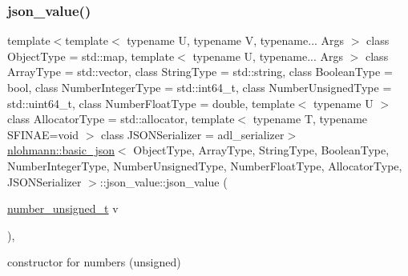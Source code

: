 \subsubsection{\texorpdfstring{json\+\_\+value()}{json\_value()}\hspace{0.1cm}{\footnotesize\ttfamily [4/12]}}
{\footnotesize\ttfamily template$<$template$<$ typename U, typename V, typename... Args $>$ class Object\+Type = std\+::map, template$<$ typename U, typename... Args $>$ class Array\+Type = std\+::vector, class String\+Type  = std\+::string, class Boolean\+Type  = bool, class Number\+Integer\+Type  = std\+::int64\+\_\+t, class Number\+Unsigned\+Type  = std\+::uint64\+\_\+t, class Number\+Float\+Type  = double, template$<$ typename U $>$ class Allocator\+Type = std\+::allocator, template$<$ typename T, typename S\+F\+I\+N\+A\+E=void $>$ class J\+S\+O\+N\+Serializer = adl\+\_\+serializer$>$ \\
\hyperlink{classnlohmann_1_1basic__json}{nlohmann\+::basic\+\_\+json}$<$ Object\+Type, Array\+Type, String\+Type, Boolean\+Type, Number\+Integer\+Type, Number\+Unsigned\+Type, Number\+Float\+Type, Allocator\+Type, J\+S\+O\+N\+Serializer $>$\+::json\+\_\+value\+::json\+\_\+value (\begin{DoxyParamCaption}\item[{\hyperlink{classnlohmann_1_1basic__json_ab906e29b5d83ac162e823ada2156b989}{number\+\_\+unsigned\+\_\+t}}]{v }\end{DoxyParamCaption})\hspace{0.3cm}{\ttfamily [inline]}, {\ttfamily [noexcept]}}



constructor for numbers (unsigned) 

\mbox{\label{unionnlohmann_1_1basic__json_1_1json__value_a39a41858abe635623710e1b0ce827593}} 
